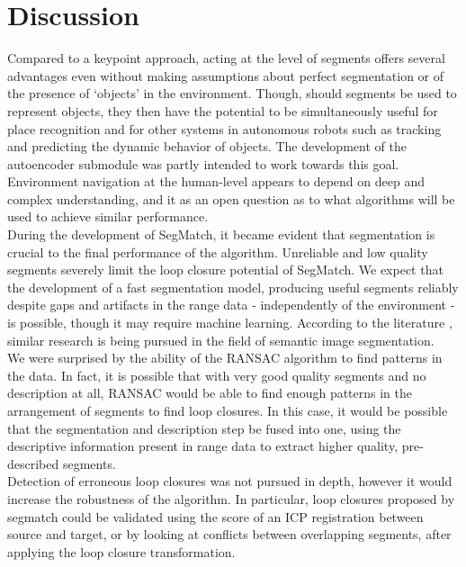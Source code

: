 \chapter{Discussion}
\label{chap:discussion}

Compared to a keypoint approach, acting at the level of segments offers several advantages even without making assumptions about perfect segmentation or of the presence of `objects' in the environment. Though, should segments be used to represent objects, they then have the potential to be simultaneously useful for place recognition and for other systems in autonomous robots such as tracking and predicting the dynamic behavior of objects. The development of the autoencoder submodule was partly intended to work towards this goal. Environment navigation at the human-level appears to depend on deep and complex understanding, and it as an open question as to what algorithms will be used to achieve similar performance.\\

During the development of SegMatch, it became evident that segmentation is crucial to the final performance of the algorithm. Unreliable and low quality segments severely limit the loop closure potential of SegMatch. We expect that the development of a fast segmentation model, producing useful segments reliably despite gaps and artifacts in the range data - independently of the environment - is possible, though it may require machine learning. According to the literature \cite{semantic}, similar research is being pursued in the field of semantic image segmentation.\\

We were surprised by the ability of the RANSAC algorithm to find patterns in the data. In fact, it is possible that with very good quality segments and no description at all, RANSAC would be able to find enough patterns in the arrangement of segments to find loop closures. In this case, it would be possible that the segmentation and description step be fused into one, using the descriptive information present in range data to extract higher quality, pre-described segments.\\

Detection of erroneous loop closures was not pursued in depth, however it would increase the robustness of the algorithm. In particular, loop closures proposed by segmatch could be validated using the score of an ICP registration between source and target, or by looking at conflicts between overlapping segments, after applying the loop closure transformation.\\


